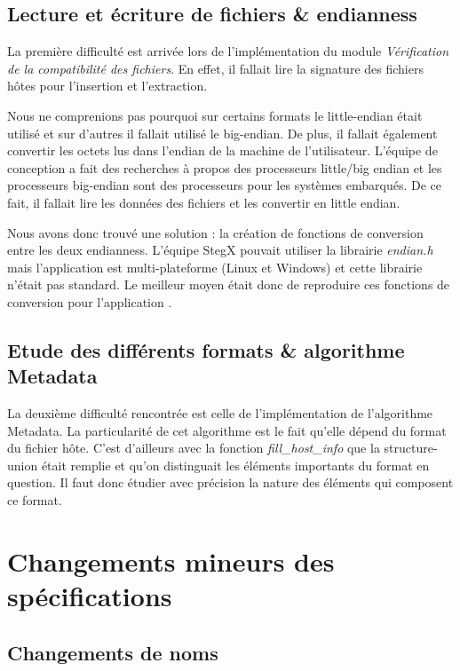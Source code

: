 \documentclass[11pt]{article}
\begin{document}
\subsection{Lecture et écriture de fichiers \& endianness}

La première difficulté est arrivée lors de l'implémentation du module 
\textit{Vérification de la compatibilité des fichiers}. En effet, il fallait 
lire la signature des fichiers hôtes pour l'insertion et l'extraction. 

Nous ne comprenions pas pourquoi sur certains formats le little-endian 
était utilisé et sur d'autres il fallait utilisé le big-endian. 
De plus, il fallait également convertir les octets lus dans l'endian de la 
machine de l'utilisateur. L'équipe de conception a fait des recherches à 
propos des processeurs little/big endian et les processeurs big-endian sont 
des processeurs pour les systèmes embarqués. De ce fait, il fallait lire 
les données des fichiers et les convertir en little endian. 

Nous avons donc trouvé une solution : la création de fonctions de 
conversion entre les deux endianness. L'équipe StegX pouvait utiliser la 
librairie \textit{endian.h} mais l'application est multi-plateforme (Linux 
et Windows) et cette librairie n'était pas standard. Le meilleur moyen était 
donc de reproduire ces fonctions de conversion pour l'application 
\label{endian}. 

\subsection{Etude des différents formats \& algorithme Metadata}

La deuxième difficulté rencontrée est celle de l'implémentation de 
l'algorithme Metadata. La particularité de cet algorithme est le fait 
qu'elle dépend du format du fichier hôte. C'est d'ailleurs avec la fonction 
\textit{fill\_host\_info} que la structure-union était remplie et qu'on 
distinguait les éléments importants du format en question.  
Il faut donc étudier avec précision la nature des éléments qui composent
ce format.  

\section{Changements mineurs des spécifications}

\subsection{Changements de noms}
\end{document}
